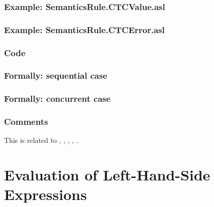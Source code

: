\documentclass{book}
\begin{document}
  \subsection{Example: SemanticsRule.CTCValue.asl}

  \subsection{Example: SemanticsRule.CTCError.asl}

  \subsection{Code}

\begin{emptyformal}
  \subsection{Formally: sequential case}

  \subsection{Formally: concurrent case}
\end{emptyformal}

\subsection{Comments}
  This is related to , , , , .

\chapter{Evaluation of Left-Hand-Side Expressions \label{chap:eval_lexpr}}
\end{document}

